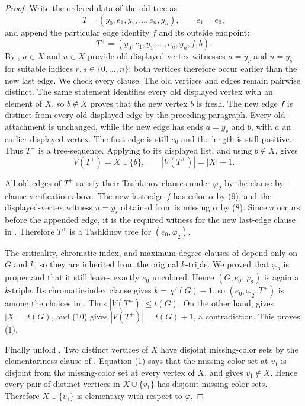 \begin{proof}
Write the ordered data of the old tree as
\[
 T=(y_0,e_1,y_1,\ldots,e_n,y_n),\qquad e_1=e_0,
\]
and append the particular edge identity $f$ and its outside endpoint:
\[
 T^+=(y_0,e_1,y_1,\ldots,e_n,y_n,f,b).
\]
By , $a\in X$ and $u\in X$ provide old
displayed-vertex witnesses $a=y_r$ and $u=y_s$ for suitable indices
$r,s\in\{0,\ldots,n\}$; both vertices therefore occur earlier than the
new last edge.  We check every  clause.  The old
vertices and edges remain pairwise distinct.  The same
 statement identifies every old displayed
vertex with an element of $X$, so $b\notin X$ proves that the new vertex
$b$ is fresh.  The new edge $f$ is distinct from every old displayed edge
by the preceding paragraph.  Every old attachment is unchanged, while
the new edge has ends $a=y_r$ and $b$, with $a$ an earlier displayed
vertex.  The first edge is still $e_0$ and the length is still positive.
Thus $T^+$ is a tree-sequence.  Applying
 to its displayed list, and using $b\notin
X$, gives
\[
 V(T^+)=X\cup\{b\},\qquad |V(T^+)|=|X|+1. \tag{10}
\]

All old edges of $T^+$ satisfy their Tashkinov clauses under $\varphi_2$
by the clause-by-clause verification above.  The new last edge $f$ has
color $\alpha$ by (9), and the displayed-vertex witness $u=y_s$ obtained
from  is missing $\alpha$ by (8).  Since
$u$ occurs before the appended edge, it is the required witness for the
new last-edge clause in .  Therefore $T^+$ is a
Tashkinov tree for $(e_0,\varphi_2)$.

The criticality, chromatic-index, and maximum-degree clauses of
 depend only on $G$ and $k$, so they are inherited from
the original $k$-triple.  We proved that $\varphi_2$ is proper and that it
still leaves exactly $e_0$ uncolored.  Hence
$(G,e_0,\varphi_2)$ is again a $k$-triple.  Its chromatic-index clause
gives $k=\chi'(G)-1$, so $(e_0,\varphi_2,T^+)$ is among the choices in
.  Thus $|V(T^+)|\le t(G)$.  On the other hand,
 gives $|X|=t(G)$, and (10) gives
$|V(T^+)|=t(G)+1$, a contradiction.  This proves (1).

Finally unfold .  Two distinct
vertices of $X$ have disjoint missing-color sets by the elementariness
clause of .  Equation (1) says that
the missing-color set at $v_1$ is disjoint from the missing-color set at
every vertex of $X$, and
 gives $v_1\notin X$.  Hence every pair
of distinct vertices in $X\cup\{v_1\}$ has disjoint missing-color sets.
Therefore $X\cup\{v_1\}$ is elementary with respect to $\varphi$.
\end{proof}
